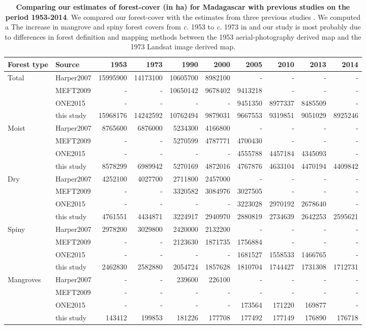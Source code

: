 \documentclass[a4paper, 12pt, leqno]{article} %
\begin{document}
\begin{table}[!h]
  {\footnotesize
  \begin{longtable}[]{@{}llrrrrrrrr@{}}
    \toprule
    Forest type & Source & 1953 & 1973 & 1990 & 2000 & 2005 & 2010 & 2013 &
    2014\tabularnewline
    \midrule
    \endhead
    Total & Harper2007 & 15995900 & 14173100 & 10605700 & 8982100 & - & - &
    - & -\tabularnewline
    & MEFT2009 & - & - & 10650142 & 9678402 & 9413218 & - & - &
    -\tabularnewline
    & ONE2015 & - & - & - & - & 9451350 & 8977337 & 8485509 &
    -\tabularnewline
    & this study & 15968176 & 14242592 & 10762494 & 9879031 & 9667553 &
    9319851 & 9051029 & 8925246\tabularnewline
    Moist & Harper2007 & 8765600 & 6876000 & 5234300 & 4166800 & - & - & - &
    -\tabularnewline
    & MEFT2009 & - & - & 5270599 & 4787771 & 4700430 & - & - &
    -\tabularnewline
    & ONE2015 & - & - & - & - & 4555788 & 4457184 & 4345093 &
    -\tabularnewline
    & this study & 8578299 & 6989942 & 5270169 & 4872016 & 4767876 & 4633104
    & 4470194 & 4409842\tabularnewline
    Dry & Harper2007 & 4252100 & 4027700 & 2711800 & 2457000 & - & - & - &
    -\tabularnewline
    & MEFT2009 & - & - & 3320582 & 3084976 & 3027505 & - & - &
    -\tabularnewline
    & ONE2015 & - & - & - & - & 3223028 & 2970192 & 2678640 &
    -\tabularnewline
    & this study & 4761551 & 4434871 & 3224917 & 2940970 & 2880819 & 2734639
    & 2642253 & 2595621\tabularnewline
    Spiny & Harper2007 & 2978200 & 3029800 & 2420000 & 2132200 & - & - & - &
    -\tabularnewline
    & MEFT2009 & - & - & 2123630 & 1871735 & 1756884 & - & - &
    -\tabularnewline
    & ONE2015 & - & - & - & - & 1681527 & 1558533 & 1466765 &
    -\tabularnewline
    & this study & 2462830 & 2582880 & 2054724 & 1857628 & 1810704 & 1744427
    & 1731308 & 1712731\tabularnewline
    Mangroves & Harper2007 & - & - & 239600 & 226100 & - & - & - &
    -\tabularnewline
    & MEFT2009 & - & - & - & - & - & - & - & -\tabularnewline
    & ONE2015 & - & - & - & - & 173564 & 171220 & 169877 & -\tabularnewline
    & this study & 143412 & 199853 & 181226 & 177708 & 177492 & 177149 &
    176890 & 176718\tabularnewline
    \bottomrule
  \end{longtable}}
  \addtocounter{table}{-1}

  \caption{\textbf{Comparing our estimates of forest-cover (in ha) for
      Madagascar with previous studies on the period 1953-2014}. We compared
    our forest-cover with the estimates from three previous studies
    \citep{Harper2007, MEFT2009, ONE2015}. We computed a The increase in
    mangrove and spiny forest covers from \emph{c.} 1953 to \emph{c.} 1973
    in \citet{Harper2007} and our study is most probably due to differences
    in forest definition and mapping methods between the 1953
    aerial-photography derived map and the 1973 Landsat image derived map.}

  \label{tab:comp_forest}
\end{table}
\end{document}
